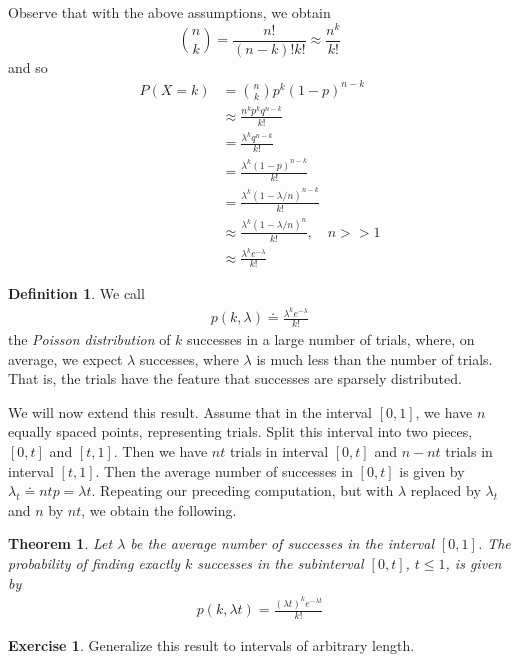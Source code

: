 \documentclass[12pt]{article}
\theoremstyle{plain}
\newtheorem{theorem}{Theorem}
\theoremstyle{definition}
\newtheorem*{definition}{Definition}
\newtheorem*{exercise}{Exercise}
\theoremstyle{remark}
\numberwithin{equation}{section}  %
\begin{document}
Observe that with the above assumptions, we obtain
\begin{equation*}
\binom{n}{k} = \frac{n!}{(n-k)! k!} \approx \frac{n^k}{k!}
\end{equation*}
and so
\begin{align*}
P(X = k)
& = \binom{n}{k} p^k (1 - p)^{n-k} \\
& \approx \frac{n^k p^k q^{n-k}}{k!} \\
& = \frac{\lambda^k q^{n-k}}{k!} \\
& = \frac{\lambda^k (1-p)^{n-k}}{k!} \\
& = \frac{\lambda^k (1-\lambda/n)^{n-k}}{k!} \\
& \approx \frac{\lambda^k (1-\lambda/n)^{n}}{k!} , \quad n >> 1\\
& \approx \frac{\lambda^k e^{-\lambda}}{k!}
\end{align*}
\begin{definition}
We call
\begin{align*}
p(k, \lambda) \doteq \frac{\lambda^k e^{-\lambda}}{k!}
\end{align*}
the \emph{Poisson distribution} of $k$ successes in a large number
of trials, where, on average, we expect $\lambda$ successes, 
where $\lambda$ is much less than the number of trials. 
That is, the trials have the feature that successes are
sparsely distributed.
\end{definition}
We will now extend this result. Assume that in the interval $[0,1]$,
we have $n$ equally spaced points, representing trials. Split this interval into two pieces,
$[0,t]$ and $[t, 1]$. Then we have $nt$ trials in interval $[0,t]$ and
$n - nt$ trials in interval $[t,1]$. Then the average number of successes
in $[0,t]$ is given by $\lambda_t \doteq n t p = \lambda t$. Repeating
our preceding computation, but with $\lambda$ replaced by $\lambda_t$
and $n$ by $nt$, we obtain the following.
\begin{theorem}
Let $\lambda$ be the average number of successes in the interval $[0,1]$.
The probability of finding exactly $k$ successes  in the subinterval $[0,t]$,
$t \le 1$, is given by
\begin{align*}
p(k, \lambda t) = \frac{ (\lambda t)^{k} e^{-\lambda t}}{k!}
\end{align*}
\end{theorem}
\begin{exercise}
Generalize this result to intervals of arbitrary length.
\end{exercise}
\end{document}
